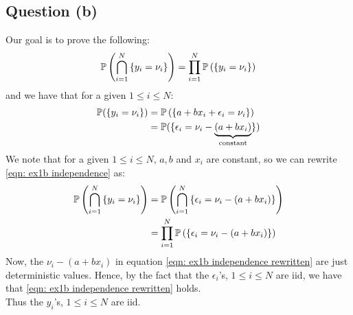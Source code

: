 \documentclass[12pt]{article}
\begin{document}
\subsection{Question (b)}
Our goal is to prove the following:
\begin{equation}
    \label{eqn: ex1b independence}
    \P\left(\bigcap_{i=1}^N \left\{y_i = \nu_i\right\}\right) = \prod_{i=1}^N \P\left(\left\{y_i = \nu_i\right\}\right)
\end{equation}
and we have that for a given \(1 \leq i \leq N\):
\begin{align*}
    \P(\{y_i = \nu_i\})
     & = \P \left(\left\{a + bx_i + \epsilon_i = \nu_i\right\}\right)              \\
     & = \P (\{\epsilon_i = \nu_i - \underbrace{(a + bx_i)}_{\textrm{constant}}\}) \\
\end{align*}
We note that for a given \(1 \leq i \leq N\), \(a, b\) and \(x_i\) are constant, so we can rewrite \eqref{eqn: ex1b independence} as:
\begin{align}
    \nonumber
    \P\left(\bigcap_{i=1}^N \left\{y_i = \nu_i\right\}\right)
     & =\P\left(\bigcap_{i=1}^N \left\{\epsilon_i = \nu_i - (a + bx_i)\right\}\right) \\
    \label{eqn: ex1b independence rewritten}
     & = \prod_{i=1}^N \P\left(\left\{\epsilon_i = \nu_i - (a + bx_i)\right\}\right)
\end{align}
Now,  the \(\nu_i - (a + bx_i)\) in equation \eqref{eqn: ex1b independence rewritten} are just deterministic values. Hence, by the fact that the \(\epsilon_i\)'s, \(1 \leq i \leq N\) are \gls{iid}, we have that \eqref{eqn: ex1b independence rewritten} holds. \\
Thus the \(y_i\)'s, \(1 \leq i \leq N\) are \gls{iid}.
\end{document}
